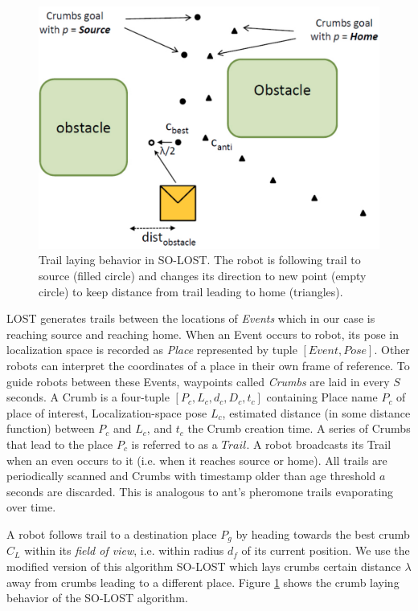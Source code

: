 \documentclass[letterpaper, 10 pt, conference]{ieeeconf}  %
\begin{document}
\begin{figure}
   \includegraphics[width=0.9\linewidth]{SO_LOST_crumb_laying.png}
   \centering
   \caption{Trail laying behavior in SO-LOST. The robot is following trail to source (filled circle) and changes its direction to new point (empty circle) to keep distance from trail leading to home (triangles).}
   \label{fig:SO_LOST_crumb_laying}
\end{figure}

LOST generates trails between the locations of \emph{Events} which in our case is reaching source and reaching home. When an Event occurs to robot, its pose in localization space is recorded as \emph{Place} represented by tuple $[Event, Pose]$. Other robots can interpret the coordinates of a place in their own frame of reference. To guide robots between these Events, waypoints called \emph{Crumbs} are laid in every $S$ seconds. A Crumb is a four-tuple $[P_c, L_c, d_c, D_c, t_c]$ containing Place name $P_c$ of place of interest, Localization-space pose $L_c$, estimated distance (in some distance function) between $P_c$ and $L_c$, and $t_c$ the Crumb creation time. A series of Crumbs that lead to the place $P_c$ is referred to as a $Trail$. A robot broadcasts its Trail when an even occurs to it (i.e. when it reaches source or home). All trails are periodically scanned and Crumbs with timestamp older than age threshold $a$ seconds are discarded. This is analogous to ant's pheromone trails evaporating over time.

A robot follows trail to a destination place $P_g$ by heading towards the best crumb $C_L$ within its \emph{field of view}, i.e. within radius $d_f$ of its current position. We use the modified version of this algorithm SO-LOST which lays crumbs certain distance $\lambda$ away from crumbs leading to a different place. Figure \ref{fig:SO_LOST_crumb_laying} shows the crumb laying behavior of the SO-LOST algorithm. 
\end{document}

